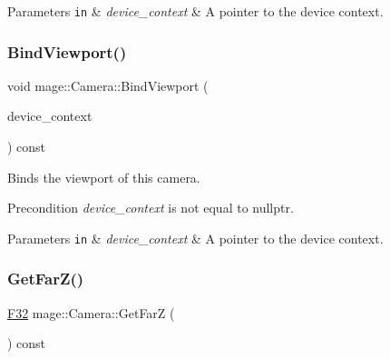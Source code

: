 \begin{DoxyParams}[1]{Parameters}
\mbox{\tt in}  & {\em device\+\_\+context} & A pointer to the device context. \\
\hline
\end{DoxyParams}
\hypertarget{classmage_1_1_camera_a905515a4ffae0bb126aff858ec677231}{}\label{classmage_1_1_camera_a905515a4ffae0bb126aff858ec677231} 
\subsubsection{\texorpdfstring{Bind\+Viewport()}{BindViewport()}}
{\footnotesize\ttfamily void mage\+::\+Camera\+::\+Bind\+Viewport (\begin{DoxyParamCaption}\item[{I\+D3\+D11\+Device\+Context4 $\ast$}]{device\+\_\+context }\end{DoxyParamCaption}) const\hspace{0.3cm}{\ttfamily [noexcept]}}

Binds the viewport of this camera.

\begin{DoxyPrecond}{Precondition}
{\itshape device\+\_\+context} is not equal to {\ttfamily nullptr}. 
\end{DoxyPrecond}

\begin{DoxyParams}[1]{Parameters}
\mbox{\tt in}  & {\em device\+\_\+context} & A pointer to the device context. \\
\hline
\end{DoxyParams}
\hypertarget{classmage_1_1_camera_a47e6801d228891453540b0c1e787724a}{}\label{classmage_1_1_camera_a47e6801d228891453540b0c1e787724a} 
\subsubsection{\texorpdfstring{Get\+Far\+Z()}{GetFarZ()}}
{\footnotesize\ttfamily \hyperlink{namespacemage_aa97e833b45f06d60a0a9c4fc22ae02c0}{F32} mage\+::\+Camera\+::\+Get\+FarZ (\begin{DoxyParamCaption}{ }\end{DoxyParamCaption}) const\hspace{0.3cm}{\ttfamily [noexcept]}}

